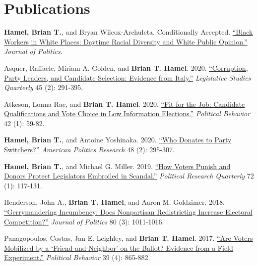 \documentclass[12pt]{article}
\begin{document}
\section*{Publications}

\begin{etaremune}[topsep = 0pt, itemsep = 1ex, partopsep  = 1ex, parsep = 1ex]

	\item \textbf{Hamel, Brian T.}, and Bryan Wilcox-Archuleta. Conditionally Accepted. \href{https://www.brianhamel.me/files/context.pdf}{``Black Workers in White Places: Daytime Racial Diversity and White Public Opinion.''} \textit{Journal of Politics}.

	\item Asquer, Raffaele, Miriam A. Golden, and \textbf{Brian T. Hamel}. 2020. \href{https://www.brianhamel.me/files/italy.pdf}{``Corruption, Party Leaders, and Candidate Selection: Evidence from Italy.''} \textit{Legislative Studies Quarterly} 45 (2): 291-395.
	
	\item Atkeson, Lonna Rae, and \textbf{Brian T. Hamel}. 2020. \href{https://www.brianhamel.me/files/teachers.pdf}{``Fit for the Job: Candidate Qualifications and Vote Choice in Low Information Elections.''} \textit{Political Behavior} 42 (1): 59-82.
	
	\item \textbf{Hamel, Brian T.}, and Antoine Yoshinaka. 2020. \href{https://www.brianhamel.me/files/switchers.pdf}{``Who Donates to Party Switchers?''} \textit{American Politics Research} 48 (2): 295-307.

	\item \textbf{Hamel, Brian T.}, and Michael G. Miller. 2019. \href{https://www.brianhamel.me/files/scandal.pdf}{``How Voters Punish and Donors Protect Legislators Embroiled in Scandal.''} \textit{Political Research Quarterly} 72 (1): 117-131.

	\item Henderson, John A., \textbf{Brian T. Hamel}, and Aaron M. Goldzimer. 2018. \href{https://www.brianhamel.me/files/gerrymandering.pdf}{``Gerrymandering Incumbency: Does Nonpartisan Redistricting Increase Electoral Competition?''} \textit{Journal of Politics} 80 (3): 1011-1016.

	\item Panagopoulos, Costas, Jan E. Leighley, and \textbf{Brian T. Hamel}. 2017. \href{https://www.brianhamel.me/files/friends.pdf}{``Are Voters Mobilized by a `Friend-and-Neighbor' on the Ballot? Evidence from a Field Experiment.''} \textit{Political Behavior} 39 (4): 865-882.

\end{etaremune}
\end{document}
